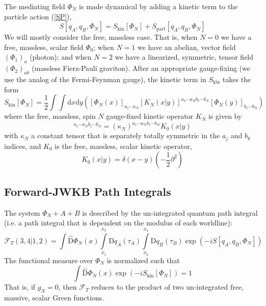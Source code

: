 The mediating field $\Phi_{N}$ is made dynamical by adding a kinetic term to the particle action (\ref{SP}),
\begin{equation}
	S[ q_{A}, q_{B}, \Phi_{N} ] = S_{\text{kin}}[\Phi_{N}] + S_{\text{part}}[ q_{A}, q_{B}, \Phi_{N} ]
\end{equation}
We will mostly consider the free, massless case. That is, when $N = 0$ we have a free, massless, scalar field $\Phi_{0}$; when $N = 1$ we have an abelian, vector field $(\Phi_{1})_{a}$ (photon); and when $N = 2$ we have a linearized, symmetric, tensor field $(\Phi_{2})_{ab}$ (massless Fierz-Pauli graviton). After an appropriate gauge-fixing (we use the analog of the Fermi-Feynman gauge), the kinetic term in $S_{\text{kin}}$ takes the form
\begin{equation}
	S_{\text{kin}}[\Phi_{N}] = \frac{1}{2} \int \int \mathrm{d}x \mathrm{d}y \left( [\Phi_{N}(x)]_{a_{1} \cdots a_{N}} [K_{N}(x|y)]^{a_{1} \cdots a_{N} b_{1} \cdots b_{N}} [\Phi_{N}(y)]_{b_{1} \cdots b_{N}} \right)
\end{equation}
where the free, massless, spin $N$ gauge-fixed kinetic operator $K_{N}$ is given by
\begin{equation}
	[K_{N}(x|y)]^{a_{1} \cdots a_{N} b_{1} \cdots b_{N}} = (\kappa_{N})^{a_{1} \cdots a_{N} b_{1} \cdots b_{N}} K_{0}(x|y)
\end{equation}
with $\kappa_{N}$ a constant tensor that is separately totally symmetric in the $a_{j}$ and $b_{k}$ indices, and $K_{0}$ is the free, massless, scalar kinetic operator,
\begin{equation}
	K_{0}(x|y) = \delta(x - y) \left(- \frac{1}{2} \partial^{2} \right)
\end{equation}
\subsection{Forward-JWKB Path Integrals}
The system $\Phi_{N} + A + B$ is described by the un-integrated quantum path integral (i.e. a path integral that is dependent on the modulus of each worldline):
\begin{equation}
	\mathcal{F}_{T}(3, 4|1, 2) = \int \widehat{\mathrm{D}}\Phi_{N}(x) \int\limits_{x_{1}}^{x_{3}} \mathrm{D}q_{A}(\tau_{A}) \int\limits_{x_{2}}^{x_{4}} \mathrm{D}q_{B}(\tau_{B}) \exp{\left( - i S\left[ q_{A}, q_{B}, \Phi_{N} \right] \right)}
\end{equation}
The functional measure over $\Phi_{N}$ is normalized such that
\begin{equation}
	\int \widehat{\mathrm{D}}\Phi_{N}(x) \exp{\left(- i S_{\text{kin}}[\Phi_{N}] \right)} = 1
\end{equation}
That is, if $g_{N} = 0$, then $\mathcal{F}_{T}$ reduces to the product of two un-integrated free, massive, scalar Green functions.

